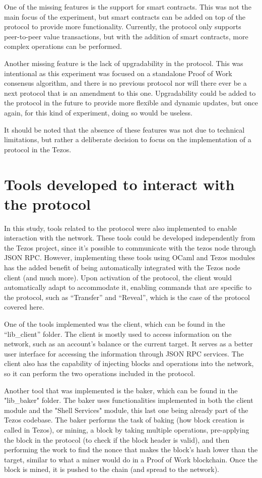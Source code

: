 One of the missing features is the support for smart contracts. This was not the main focus of the experiment, but smart contracts can be added on top of the protocol to provide more functionality. Currently, the protocol only supports peer-to-peer value transactions, but with the addition of smart contracts, more complex operations can be performed.

Another missing feature is the lack of upgradability in the protocol. This was intentional as this experiment was focused on a standalone Proof of Work consensus algorithm, and there is no previous protocol nor will there ever be a next protocol that is an amendment to this one. Upgradability could be added to the protocol in the future to provide more flexible and dynamic updates, but once again, for this kind of experiment, doing so would be useless.

It should be noted that the absence of these features was not due to technical limitations, but rather a deliberate decision to focus on the implementation of a protocol in the Tezos.

\section{Tools developed to interact with the protocol}

In this study, tools related to the protocol were also implemented to enable interaction with the network. These tools could be developed independently from the Tezos project, since it's possible to communicate with the tezos node through JSON RPC. However, implementing these tools using OCaml and Tezos modules has the added benefit of being automatically integrated with the Tezos node client (and much more). Upon activation of the protocol, the client would automatically adapt to accommodate it, enabling commands that are specific to the protocol, such as ``Transfer'' and ``Reveal'', which is the case of the protocol covered here.

One of the tools implemented was the client, which can be found in the ``lib\_client'' folder. The client is mostly used to access information on the network, such as an account's balance or the current target. It serves as a better user interface for accessing the information through JSON RPC services. The client also has the capability of injecting blocks and operations into the network, so it can perform the two operations included in the protocol.

Another tool that was implemented is the baker, which can be found in the "lib\_baker" folder. The baker uses functionalities implemented in both the client module and the "Shell Services" module, this last one being already part of the Tezos codebase.
The baker performs the task of baking (how block creation is called in Tezos), or mining, a block by taking multiple operations, pre-applying the block in the protocol (to check if the block header is valid), and then performing the work to find the nonce that makes the block's hash lower than the target, similar to what a miner would do in a Proof of Work blockchain. Once the block is mined, it is pushed to the chain (and spread to the network).

